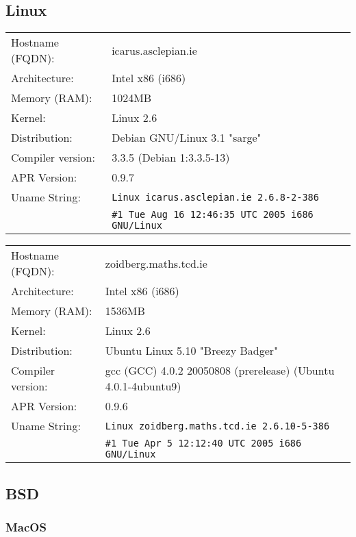 
\subsection{Linux}

\begin{tabular}{ll}
Hostname (FQDN):	&	icarus.asclepian.ie 				\\
Architecture:		&	Intel x86 (i686)					\\
Memory (RAM):		&	1024MB								\\
Kernel:				&	Linux 2.6							\\
Distribution:		&	Debian GNU/Linux 3.1 "sarge"	\\
Compiler version:	&	3.3.5 (Debian 1:3.3.5-13)		\\
APR Version:		&	0.9.7									\\
Uname String:		& \verb!Linux icarus.asclepian.ie 2.6.8-2-386! 		\\
						& \verb!#1 Tue Aug 16 12:46:35 UTC 2005 i686 GNU/Linux!	\\
\end{tabular}

\begin{tabular}{ll}
Hostname (FQDN):	&	zoidberg.maths.tcd.ie					\\
Architecture:		&	Intel x86 (i686)							\\
Memory (RAM):		&	1536MB										\\
Kernel:				&	Linux 2.6									\\
Distribution:		&	Ubuntu Linux 5.10 "Breezy Badger"	\\
Compiler version:	&	gcc (GCC) 4.0.2 20050808 (prerelease) (Ubuntu 4.0.1-4ubuntu9)\\
APR Version:		&	0.9.6									\\
Uname String:		& \verb!Linux zoidberg.maths.tcd.ie 2.6.10-5-386!\\
						& \verb!#1 Tue Apr 5 12:12:40 UTC 2005 i686 GNU/Linux!\\

\end{tabular}

\subsection{BSD}

\subsubsection{MacOS}

